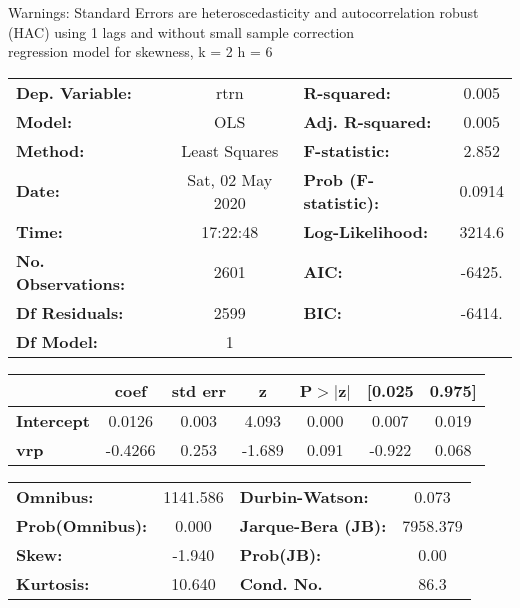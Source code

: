 Warnings: \newline
 [1] Standard Errors are heteroscedasticity and autocorrelation robust (HAC) using 1 lags and without small sample correction\\ 

regression model for skewness, k = 2 h = 6\begin{center}
\begin{tabular}{lclc}
\toprule
\textbf{Dep. Variable:}    &       rtrn       & \textbf{  R-squared:         } &     0.005   \\
\textbf{Model:}            &       OLS        & \textbf{  Adj. R-squared:    } &     0.005   \\
\textbf{Method:}           &  Least Squares   & \textbf{  F-statistic:       } &     2.852   \\
\textbf{Date:}             & Sat, 02 May 2020 & \textbf{  Prob (F-statistic):} &   0.0914    \\
\textbf{Time:}             &     17:22:48     & \textbf{  Log-Likelihood:    } &    3214.6   \\
\textbf{No. Observations:} &        2601      & \textbf{  AIC:               } &    -6425.   \\
\textbf{Df Residuals:}     &        2599      & \textbf{  BIC:               } &    -6414.   \\
\textbf{Df Model:}         &           1      & \textbf{                     } &             \\
\bottomrule
\end{tabular}
\begin{tabular}{lcccccc}
                   & \textbf{coef} & \textbf{std err} & \textbf{z} & \textbf{P$> |$z$|$} & \textbf{[0.025} & \textbf{0.975]}  \\
\midrule
\textbf{Intercept} &       0.0126  &        0.003     &     4.093  &         0.000        &        0.007    &        0.019     \\
\textbf{vrp}       &      -0.4266  &        0.253     &    -1.689  &         0.091        &       -0.922    &        0.068     \\
\bottomrule
\end{tabular}
\begin{tabular}{lclc}
\textbf{Omnibus:}       & 1141.586 & \textbf{  Durbin-Watson:     } &    0.073  \\
\textbf{Prob(Omnibus):} &   0.000  & \textbf{  Jarque-Bera (JB):  } & 7958.379  \\
\textbf{Skew:}          &  -1.940  & \textbf{  Prob(JB):          } &     0.00  \\
\textbf{Kurtosis:}      &  10.640  & \textbf{  Cond. No.          } &     86.3  \\
\bottomrule
\end{tabular}
\end{center}


